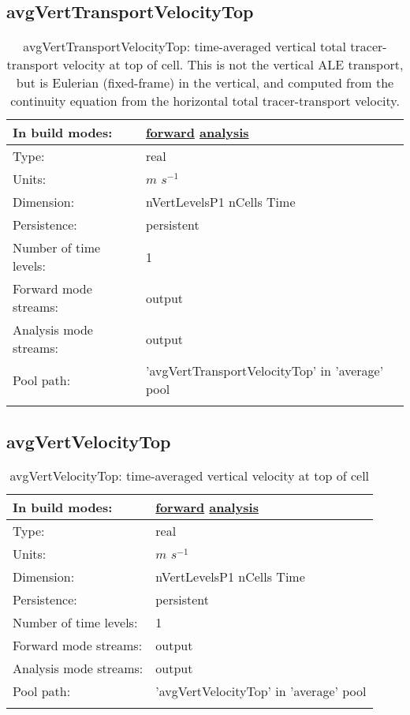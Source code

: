 \subsection[avgVertTransportVelocityTop]{avgVertTransportVelocityTop}
\label{subsec:var_sec_average_avgVertTransportVelocityTop}
\begin{center}
\begin{longtable}{| p{2.0in} | p{4.0in} |}
        \hline 
        In build modes: & \hyperref[subsec:forward_var_tab_average]{forward} \hyperref[subsec:analysis_var_tab_average]{analysis} \\
        \hline 
        Type: & real \\
        \hline 
        Units: & $m$ $s^{-1}$ \\
        \hline 
        Dimension: & nVertLevelsP1 nCells Time \\
        \hline 
        Persistence: & persistent \\
        \hline 
        Number of time levels: & 1 \\
        \hline 
		 Forward mode streams: &  output \\
        \hline 
		 Analysis mode streams: &  output \\
        \hline 
            Pool path: & 'avgVertTransportVelocityTop' in 'average' pool
 \\
		 \hline 
    \caption{avgVertTransportVelocityTop: time-averaged vertical total tracer-transport velocity at top of cell.  This is not the vertical ALE transport, but is Eulerian (fixed-frame) in the vertical, and computed from the continuity equation from the horizontal total tracer-transport velocity.}
\end{longtable}
\end{center}
\subsection[avgVertVelocityTop]{avgVertVelocityTop}
\label{subsec:var_sec_average_avgVertVelocityTop}
\begin{center}
\begin{longtable}{| p{2.0in} | p{4.0in} |}
        \hline 
        In build modes: & \hyperref[subsec:forward_var_tab_average]{forward} \hyperref[subsec:analysis_var_tab_average]{analysis} \\
        \hline 
        Type: & real \\
        \hline 
        Units: & $m$ $s^{-1}$ \\
        \hline 
        Dimension: & nVertLevelsP1 nCells Time \\
        \hline 
        Persistence: & persistent \\
        \hline 
        Number of time levels: & 1 \\
        \hline 
		 Forward mode streams: &  output \\
        \hline 
		 Analysis mode streams: &  output \\
        \hline 
            Pool path: & 'avgVertVelocityTop' in 'average' pool
 \\
		 \hline 
    \caption{avgVertVelocityTop: time-averaged vertical velocity at top of cell}
\end{longtable}
\end{center}
